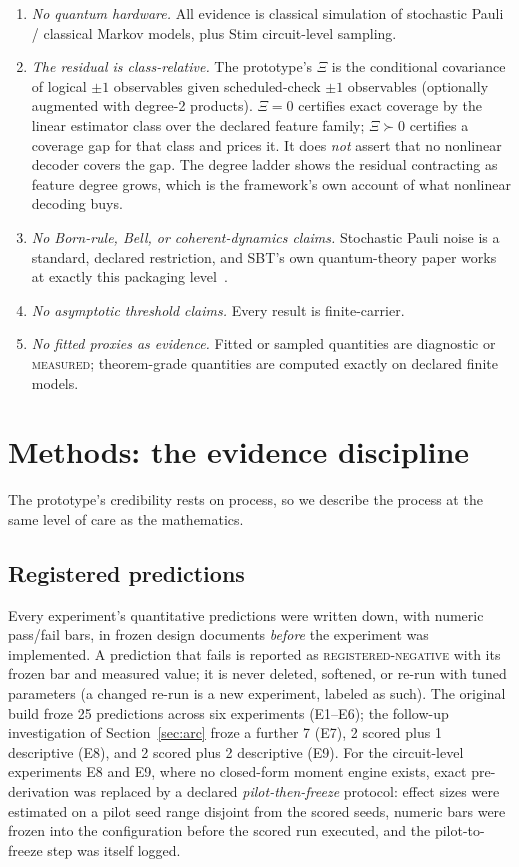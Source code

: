 \documentclass[11pt]{article}
\newcommand{\grade}[1]{\textsc{#1}}
\newcommand{\gMeasured}{\grade{measured}}
\newcommand{\gRegNeg}{\grade{registered-negative}}
\theoremstyle{definition}
\begin{document}
\begin{enumerate}
\item \emph{No quantum hardware.} All evidence is classical simulation of stochastic Pauli / classical Markov models, plus Stim circuit-level sampling.
\item \emph{The residual is class-relative.} The prototype's $\Xi$ is the conditional covariance of logical $\pm1$ observables given scheduled-check $\pm1$ observables (optionally augmented with degree-2 products). $\Xi = 0$ certifies exact coverage by the linear estimator class over the declared feature family; $\Xi \succ 0$ certifies a coverage gap for that class and prices it. It does \emph{not} assert that no nonlinear decoder covers the gap. The degree ladder shows the residual contracting as feature degree grows, which is the framework's own account of what nonlinear decoding buys.
\item \emph{No Born-rule, Bell, or coherent-dynamics claims.} Stochastic Pauli noise is a standard, declared restriction, and SBT's own quantum-theory paper works at exactly this packaging level~\cite{sbt-qm}.
\item \emph{No asymptotic threshold claims.} Every result is finite-carrier.
\item \emph{No fitted proxies as evidence.} Fitted or sampled quantities are diagnostic or \gMeasured; theorem-grade quantities are computed exactly on declared finite models.
\end{enumerate}

 \section{Methods: the evidence discipline}
\label{sec:methods}

The prototype's credibility rests on process, so we describe the process at the same level of care as the mathematics.

\subsection{Registered predictions}
\label{sec:methods-registration}

Every experiment's quantitative predictions were written down, with numeric pass/fail bars, in frozen design documents \emph{before} the experiment was implemented. A prediction that fails is reported as \gRegNeg{} with its frozen bar and measured value; it is never deleted, softened, or re-run with tuned parameters (a changed re-run is a new experiment, labeled as such). The original build froze 25 predictions across six experiments (E1--E6); the follow-up investigation of Section~\ref{sec:arc} froze a further 7 (E7), 2 scored plus 1 descriptive (E8), and 2 scored plus 2 descriptive (E9). For the circuit-level experiments E8 and E9, where no closed-form moment engine exists, exact pre-derivation was replaced by a declared \emph{pilot-then-freeze} protocol: effect sizes were estimated on a pilot seed range disjoint from the scored seeds, numeric bars were frozen into the configuration before the scored run executed, and the pilot-to-freeze step was itself logged. 
\end{document}
